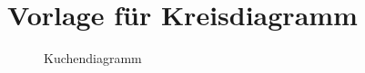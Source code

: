 \documentclass[ngerman,pdftex,12pt,a4paper]{scrreprt}
\begin{document}
\chapter{Vorlage für Kreisdiagramm}

\begin{figure}[h]
\centering
{}
\caption{Kuchendiagramm }
\label{fig:redgreen} 
\end{figure}
\end{document}
